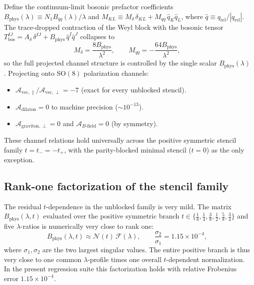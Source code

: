 \documentclass[11pt]{article}
\begin{document}
Define the continuum-limit bosonic prefactor coefficients $B_{\mathrm{phys}}(\lambda) \equiv N_1 B_{qq}(\lambda)/\lambda$ and $M_{KL} \equiv M_\delta\,\delta_{KL} + M_{qq}\,\hat q_K\hat q_L$, where $\hat q \equiv q_{\mathrm{rel}}/|q_{\mathrm{rel}}|$. The trace-dropped contraction of the Weyl block with the bosonic tensor $T^{IJ}_{\mathrm{bos}} = A_\delta\,\delta^{IJ} + B_{\mathrm{phys}}\,\hat q^I\hat q^J$ collapses to
\begin{equation}
M_\delta = \frac{8B_{\mathrm{phys}}}{\lambda^2},
\qquad
M_{qq} = -\frac{64 B_{\mathrm{phys}}}{\lambda^2},
\label{eq:projected-bosonic}
\end{equation}
so the full projected channel structure is controlled by the single scalar $B_{\mathrm{phys}}(\lambda)$. Projecting onto SO$(8)$ polarization channels:
\begin{itemize}
\item $\mathcal{A}_{\mathrm{vec},\parallel}/\mathcal{A}_{\mathrm{vec},\perp} = -7$ (exact for every unblocked stencil).
\item $\mathcal{A}_{\mathrm{dilaton}} = 0$ to machine precision ($\sim\!10^{-13}$).
\item $\mathcal{A}_{\mathrm{graviton},\perp} = 0$ and $\mathcal{A}_{B\text{-field}} = 0$ (by symmetry).
\end{itemize}
These channel relations hold universally across the positive symmetric stencil family $t = t_- = -t_+$, with the parity-blocked minimal stencil ($t = 0$) as the only exception.

\subsection{Rank-one factorization of the stencil family}

The residual $t$-dependence in the unblocked family is very mild. The matrix $B_{\mathrm{phys}}(\lambda, t)$ evaluated over the positive symmetric branch $t \in \{\tfrac{1}{8}, \tfrac{1}{4}, \tfrac{3}{8}, \tfrac{1}{2}, \tfrac{5}{8}, \tfrac{3}{4}\}$ and five $\lambda$-ratios is numerically very close to rank one:
\begin{equation}
B_{\mathrm{phys}}(\lambda, t) \approx \mathcal{N}(t)\,\mathcal{F}(\lambda),
\qquad
\frac{\sigma_2}{\sigma_1} = 1.15 \times 10^{-4},
\label{eq:rank1}
\end{equation}
where $\sigma_1, \sigma_2$ are the two largest singular values. The entire positive branch is thus very close to one common $\lambda$-profile times one overall $t$-dependent normalization. In the present regression suite this factorization holds with relative Frobenius error $1.15 \times 10^{-4}$.
\end{document}
